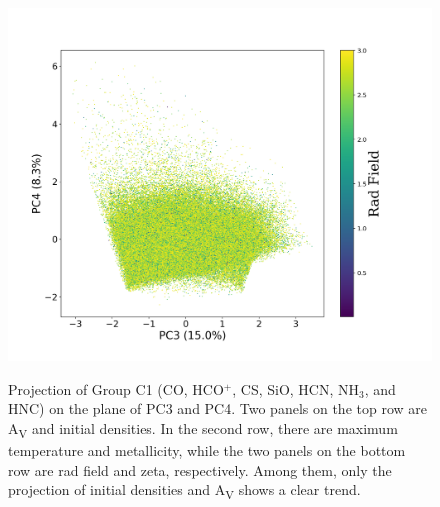 \documentclass{aa}
\begin{document}
\begin{CJK*}{UTF8}{gbsn}
\begin{figure}[htbp]
{        \includegraphics[scale = 0.27]{7/PC3&4_radfield.png}
        }
        \caption{Projection of Group C1 (CO, HCO$^+$, CS, SiO, HCN, NH$_3$, and HNC) on the plane of PC3 and PC4. Two panels on the top row are A\textsubscript{V} and initial densities. In the second row, there are maximum temperature and metallicity, while the two panels on the bottom row are rad field and zeta, respectively. Among them, only the projection of initial densities and A\textsubscript{V} shows a clear trend.}
        \label{C1-34}
     \end{figure}


\end{CJK*}
\end{document}
